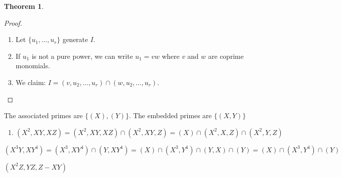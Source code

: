 \documentclass[a4paper]{book}
\theoremstyle{definition}
\newtheorem{theorem}[definition]{Theorem}
\begin{document}
\begin{theorem}
    
\end{theorem}
\begin{proof}
    \begin{enumerate}
        \item Let \(\{u_1, \ldots, u_r\}\) generate \(I\).
        \item If \(u_1\) is not a pure power, we can write \(u_1 = vw\) where \(v\) and \(w\) are coprime monomials.
        \item We claim: \(I = (v, u_2, \ldots, u_r) \cap (w, u_2, \ldots, u_r)\).
    \end{enumerate}
\end{proof}

The associated primes are \(\{(X),(Y)\}\). The embedded primes are \(\{(X, Y)\}\)


\begin{enumerate}
    \item \((X^2, XY, XZ) = (X^2, XY, XZ) \cap (X^2, XY, Z) = (X) \cap (X^2, X, Z) \cap (X^2, Y, Z)\)
\end{enumerate}


\((X^3Y, XY^4) = (X^3, XY^4) \cap (Y, XY^4) = (X) \cap (X^3, Y^4) \cap (Y, X) \cap (Y) = (X) \cap (X^3, Y^4) \cap (Y)\)


\((X^2Z, YZ, Z - XY)\)
\end{document}
